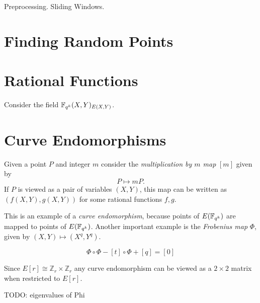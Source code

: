 Preprocessing. Sliding Windows.

\section {Finding Random Points}

\section {Rational Functions}

Consider the field $\mathbb{F}_{q^k}(X,Y)_{E(X,Y)}$.

\section {Curve Endomorphisms}

Given a point $P$ and integer $m$ consider the \emph{multiplication by $m$ map}
$[m]$ given by \[ P \mapsto m P . \]
If $P$ is viewed as a pair of variables $(X,Y)$, this map
can be written as $(f(X,Y), g(X,Y))$ for some rational functions $f,g$.

This is an example of a \emph{curve endomorphism}, because points of
$E(\mathbb{F}_{q^k})$ are mapped to points of $E(\mathbb{F}_{q^k})$. Another important example
is the \emph{Frobenius map} $\Phi$, given by $(X, Y) \mapsto (X^q, Y^q)$.

\begin{theorem}
[Hasse]
\[ \Phi \circ \Phi - [t] \circ \Phi + [q] = [0] \]
\end{theorem}

Since $E[r] \cong \mathbb{Z}_r \times \mathbb{Z}_r$ any curve endomorphism
can be viewed as a $2\times2$ matrix when restricted to $E[r]$.

TODO: eigenvalues of Phi

